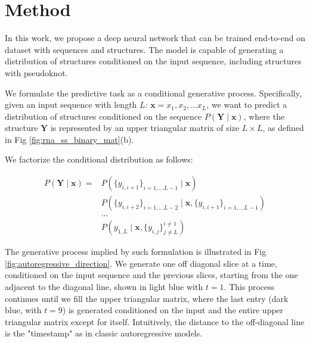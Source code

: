 \documentclass{article}
\begin{document}
\section{Method}


In this work, we propose a deep neural network that can be trained end-to-end on dataset with sequences and structures.
The model is capable of generating a distribution of structures conditioned on the input sequence,
including structures with pseudoknot.



We formulate the predictive task as a conditional generative process.
Specifically, given an input sequence with length $L$: $\bm{x} = x_1, x_2, \dots x_{L}$,
we want to predict a distribution of structures conditioned on the sequence $P(\bm{Y} \mid \bm{x})$,
where the structure $\bm{Y}$ is represented by an upper triangular matrix of size $L \times L$, as defined in Fig \ref{fig:rna_ss_binary_mat}(b).


We factorize the conditional distribution as follows:



\begin{equation}
    \label{eq:conditional_distribution}
    \begin{split}
        P(\bm{Y} \mid \bm{x}) =& P(\{y_{i, i+1}\}_{i=1, \dots L-1} \mid \bm{x}) \\
        & P(\{y_{i, i+2}\}_{i=1, \dots L-2} \mid \bm{x}, \{y_{i, i+1}\}_{i=1, \dots L-1}) \\
        & \dots \\
        & P(y_{1, L} \mid \bm{x}, \{y_{i, j}\}^{i \neq 1}_{j \neq L})
    \end{split}
\end{equation}


The generative process implied by such formulation is illustrated in Fig \ref{fig:autoregressive_direction}.
We generate one off diagonal slice at a time, conditioned on the input sequence and the previous slices,
starting from the one adjacent to the diagonal line, shown in light blue with $t=1$.
This process continues until we fill the upper triangular matrix,
where the last entry (dark blue, with $t=9$) is generated conditioned on the input and the entire upper triangular matrix except for itself.
Intuitively, the distance to the off-diagonal line is the "timestamp" as in classic autoregressive models.
\end{document}
